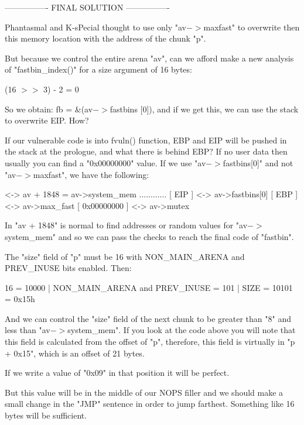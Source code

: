 \documentclass[12pt]{article}
\begin{document}
\begin{verbnobox}[\small]
----------------
 FINAL SOLUTION
----------------
\end{verbnobox}

Phantasmal and K-sPecial thought to use only "av$->$maxfast" to overwrite
then this memory location with the address of the chunk "p".

But because we control the entire arena "av", can we afford make a new
analysis of "fastbin\_index()" for a size argument of 16 bytes:

   (16 $>>$ 3) - 2 = 0

So we obtain: fb = \&(av$->$fastbins [0]), and if we get this, we can
use the stack to overwrite EIP. How?

If our vulnerable code is into fvuln() function, EBP and EIP will be
pushed in the stack at the prologue, and what there is behind EBP? If no
user data then usually you can find a "0x00000000" value. If we use
"av$->$fastbins[0]" and not "av$->$maxfast", we have the following:

\begin{verbnobox}  <->  av + 1848 = av->system\_mem
    ............
   [     EIP    ]  <->  av->fastbins[0]
   [     EBP    ]  <->  av->max\_fast
   [ 0x00000000 ]  <->  av->mutex
\end{verbnobox}
	
In "av + 1848" is normal to find addresses or random values for
"av$->$system\_mem" and so we can pass the checks to reach the final
code of "fastbin".

The "size" field of "p" must be 16 with NON\_MAIN\_ARENA and PREV\_INUSE
bits enabled. Then:
\begin{verbnobox}[\small]
   16 = 10000 | NON\_MAIN\_ARENA and PREV\_INUSE = 101 | SIZE = 10101 = 0x15h
\end{verbnobox}
	
And we can control the "size" field of the next chunk to be greater than
"8" and less than "av$->$system\_mem". If you look at the code above you will
note that this field is calculated from the offset of "p", therefore,
this field is virtually in "p + 0x15", which is an offset of 21 bytes.
\newline


If we write a value of "0x09" in that position it will be perfect.
\newline


But this value will be in the middle of our NOPS filler and we should make
a small change in the "JMP" sentence in order to jump farthest. Something
like 16 bytes will be sufficient.
\newline
\end{document}
